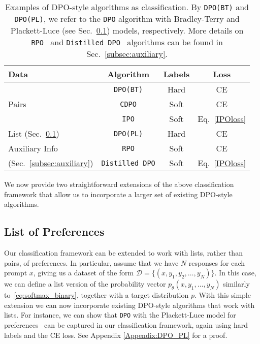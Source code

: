 \begin{table}[htb]
    \centering
    \begin{tabular}{|l||c||c|c|}
        \hline
        Data & Algorithm & Labels & Loss \\ \hline\hline
        \multirow{3}{*}{Pairs} & \texttt{DPO(BT)} & Hard & CE\\ \cline{2-4}
         & \texttt{CDPO} & Soft & CE \\ \cline{2-4}
         & \texttt{IPO} & Soft & Eq.~\eqref{IPOloss} \\ \hline\hline
        List (Sec.~\ref{subsec:Lists}) & \texttt{DPO(PL)} & Hard & CE \\ \hline\hline
         Auxiliary Info & \texttt{RPO} & Soft & CE \\ \cline{2-4}
         (Sec.~\ref{subsec:auxiliary}) & \texttt{Distilled DPO} & Soft & Eq.~\eqref{IPOloss} \\ \hline
    \end{tabular}
    \caption{Examples of DPO-style algorithms as classification. By \texttt{DPO(BT)} and \texttt{DPO(PL)}, we refer to the \texttt{DPO} algorithm with Bradley-Terry and Plackett-Luce (see Sec.~\ref{subsec:Lists}) models, respectively. More details on \texttt{RPO}~\cite{nemotron} and \texttt{Distilled DPO}~\cite{distilled_DPO} algorithms can be found in Sec.~\ref{subsec:auxiliary}.}
    \label{table_example_algorithms}
\end{table}

We now provide two straightforward extensions of the above classification framework that allow us to incorporate a larger set of existing DPO-style algorithms.

\subsection{List of Preferences}
\label{subsec:Lists} 

Our classification framework can be extended to work with lists, rather than pairs, of preferences. In particular, assume that we have $N$ responses for each prompt $x$, giving us a dataset of the form $\mathcal{D} = \{ (x,y_1, y_2,\ldots,y_N) \}.$ In this case, we can define a list version of the probability vector $p_{\theta}(x,y_1,\ldots, y_N)$ similarly to~\eqref{eq:softmax_binary}, 
%
%
together with a target distribution $p$.
With this simple extension we can now incorporate existing DPO-style algorithms that work with lists. For instance, we can show that \texttt{DPO} with the Plackett-Luce model for preferences~\cite{DPO} can be captured in our classification framework, again using hard labels and the CE loss. See Appendix \ref{Appendix:DPO_PL} for a proof.

